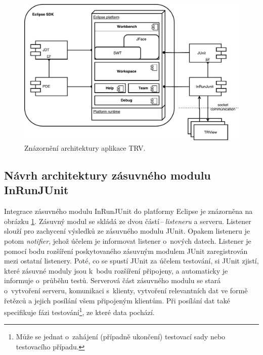   \begin{figure}
    \includegraphics[width=\textwidth, center]{obrazky-figures/TRV_architecture.pdf}
    \caption{Znázornění architektury aplikace TRV.}
    \label{fig:TRV_architecture}
  \end{figure}

    \subsection{Návrh architektury zásuvného modulu InRunJUnit}
    Integrace zásuvného modulu InRunJUnit do platformy Eclipse je znázorněna na obrázku \ref{fig:TRV_architecture}. Zásuvný modul se skládá ze dvou částí\,--\,\emph{listeneru} a serveru. Listener slouží pro zachycení výsledků ze zásuvného modulu JUnit. Opakem listeneru je potom \emph{notifier}, jehož účelem je informovat listener o~nových datech. Listener je pomocí bodu rozšíření poskytovaného zásuvným modulem JUnit zaregistrován mezi ostatní listenery. Poté, co se spustí JUnit za účelem testování, si JUnit zjistí, které zásuvné moduly jsou k~bodu rozšíření připojeny, a automaticky je informuje o~průběhu testů. Serverová část zásuvného modulu se stará o~vytvoření serveru, komunikaci s~klienty, vytvoření relevantních dat ve formě řetězců a jejich posílání všem připojeným klientům. Při posílání dat také specifikuje fázi testování\footnote{Může se jednat o~zahájení (případně ukončení) testovací sady nebo testovacího případu.}, ze které data pochází.


